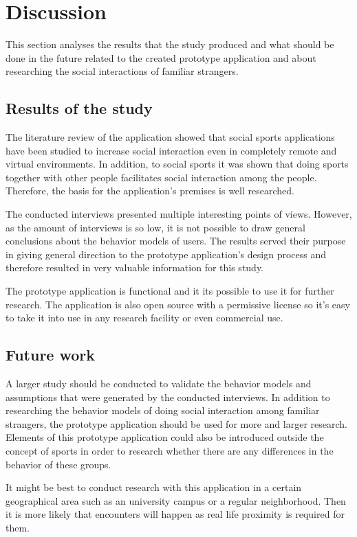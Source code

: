 \section{Discussion}

This section analyses the results that the study produced and what should be done in the future related to the created prototype application and about researching the social interactions of familiar strangers.

\subsection{Results of the study}

The literature review of the application showed that social sports applications have been studied to increase social interaction even in completely remote and virtual environments. In addition, to social sports it was shown that doing sports together with other people facilitates social interaction among the people. Therefore, the basis for the application's premises is well researched.

The conducted interviews presented multiple interesting points of views. However, as the amount of interviews is so low, it is not possible to draw general conclusions about the behavior models of users. The results served their purpose in giving general direction to the prototype application's design process and therefore resulted in very valuable information for this study.

The prototype application is functional and it its possible to use it for further research. The application is also open source with a permissive license so it's easy to take it into use in any research facility or even commercial use.

\subsection{Future work}

A larger study should be conducted to validate the behavior models and assumptions that were generated by the conducted interviews. In addition to researching the behavior models of doing social interaction among familiar strangers, the prototype application should be used for more and larger research. Elements of this prototype application could also be introduced outside the concept of sports in order to research whether there are any differences in the behavior of these groups.

It might be best to conduct research with this application in a certain geographical area such as an university campus or a regular neighborhood. Then it is more likely that encounters will happen as real life proximity is required for them.

